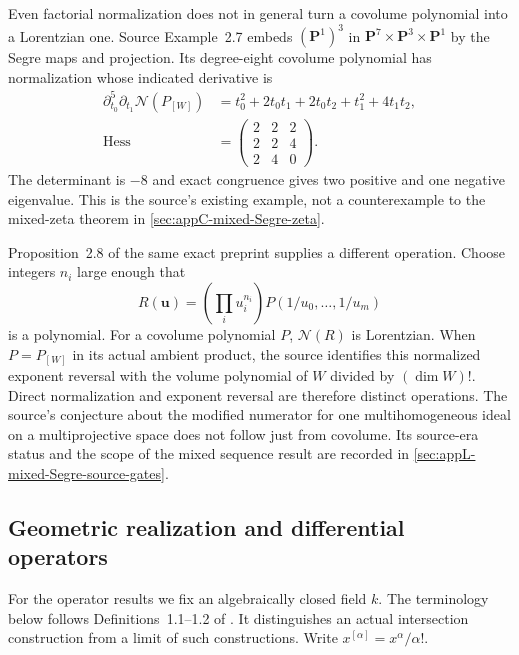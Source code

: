 Even factorial normalization does not in general turn a
covolume polynomial into a Lorentzian one. Source Example~2.7
embeds $(\mathbf P^1)^3$ in
$\mathbf P^7\times\mathbf P^3\times\mathbf P^1$ by the
Segre maps and projection. Its degree-eight covolume polynomial
has normalization whose indicated derivative is
\[
\begin{aligned}
 \partial_{t_0}^{5}\partial_{t_1}\mathcal N(P_{[W]})
    &=t_0^2+2t_0t_1+2t_0t_2+t_1^2+4t_1t_2,\\
 \operatorname{Hess}
    &=\begin{pmatrix}2&2&2\\2&2&4\\2&4&0\end{pmatrix}.
\end{aligned}
\tag{D.35}\label{eq:appD-covolume-signature-example}
\]
The determinant is $-8$ and exact congruence gives two
positive and one negative eigenvalue. This is the source's
existing example, not a counterexample to the mixed-zeta
theorem in \cref{sec:appC-mixed-Segre-zeta}.

Proposition~2.8 of the same exact preprint supplies a different
operation. Choose integers $n_i$ large enough that
\[
 R(\mathbf u)=\left(\prod_i u_i^{n_i}\right)
                         P(1/u_0,\ldots,1/u_m)
\tag{D.36}\label{eq:appD-covolume-exponent-reversal}
\]
is a polynomial. For a covolume polynomial $P$,
$\mathcal N(R)$ is Lorentzian. When $P=P_{[W]}$ in its
actual ambient product, the source identifies this normalized
exponent reversal with the volume polynomial of $W$ divided
by $(\dim W)!$. Direct normalization and exponent reversal
are therefore distinct operations. The source's conjecture
about the modified numerator for one multihomogeneous ideal
on a multiprojective space does not follow just from covolume.
Its source-era status and the scope of the mixed sequence
result are recorded in \cref{sec:appL-mixed-Segre-source-gates}.

\subsection{Geometric realization and differential operators}
\label{sec:appD-volume-operators}

For the operator results we fix an algebraically closed field $k$.
The terminology below follows Definitions~1.1--1.2 of
\cite{GrundHuhMichalekSuessWang25VolumeV1}. It distinguishes an
actual intersection construction from a limit of such constructions.
Write $x^{[\alpha]}=x^\alpha/\alpha!$.

